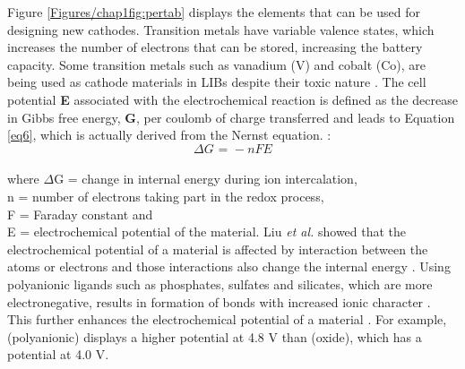 Figure \ref{Figures/chap1fig:pertab} displays the elements that can be used for designing new cathodes. Transition metals have variable valence states, which increases the number of electrons that can be stored, increasing the battery capacity. Some transition metals such as vanadium (V) and cobalt (Co), are being used as cathode materials in LIBs despite their toxic nature \cite{cui_carbon/titanium_2010,qu_vanadium_2019,salunkhe_direct_2014,spreafico_pvdf_2014}.
The cell potential \textbf{E} associated with the electrochemical reaction is defined as the decrease in Gibbs free energy, \textbf{G}, per coulomb of charge transferred and leads to Equation \ref{eq6}, which is actually derived from the Nernst equation.  :
\begin{equation} \label{eq6}
    \Delta G \text{ = } -nFE
\end{equation}\\
where $\Delta$G = change in internal energy during ion intercalation,\\
n = number of electrons taking part in the redox process,\\
F = Faraday constant and\\
E = electrochemical potential of the material. Liu \textit{et al.} showed that the electrochemical potential of a material is affected by interaction between the atoms or electrons and those interactions also change the internal energy \cite{liu_understanding_2016}. Using polyanionic ligands such as phosphates, sulfates and silicates, which are more electronegative, results in formation of bonds with increased ionic character \cite{liu_understanding_2016}. This further enhances the electrochemical potential of a material \cite{melot_design_2013}. For example,  (polyanionic) displays a higher potential at 4.8 V than  (oxide), which has a potential at 4.0 V\cite{masquelier_polyanionic_2013}. 

